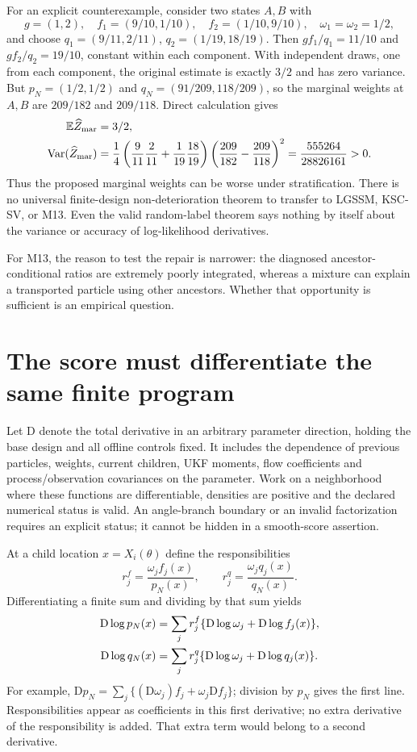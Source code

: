 \documentclass[11pt]{article}
\newcommand{\D}{\mathrm D}
\newcommand{\E}{\mathbb E}
\newcommand{\Var}{\operatorname{Var}}
\begin{document}
For an explicit counterexample, consider two states $A,B$ with
\[
 g=(1,2),\quad f_1=(9/10,1/10),\quad f_2=(1/10,9/10),
 \quad \omega_1=\omega_2=1/2,
\]
and choose $q_1=(9/11,2/11)$, $q_2=(1/19,18/19)$.
Then $g f_1/q_1=11/10$ and $g f_2/q_2=19/10$, constant within
each component. With independent draws, one from each component,
the original estimate is exactly $3/2$ and has zero variance.
But $p_N=(1/2,1/2)$ and $q_N=(91/209,118/209)$, so the marginal
weights at $A,B$ are $209/182$ and $209/118$. Direct calculation gives
\begin{align}
 \E\widehat Z_{\rm mar}&=3/2,\notag\\
 \Var(\widehat Z_{\rm mar})
 &=\frac14\left(\frac9{11}\frac2{11}
                    +\frac1{19}\frac{18}{19}\right)
            \left(\frac{209}{182}-\frac{209}{118}\right)^2
 =\frac{555264}{28826161}>0 .
 \label{eq:counterexample}
\end{align}
Thus the proposed marginal weights can be worse under stratification.
There is no universal finite-design non-deterioration theorem to transfer
to LGSSM, KSC-SV, or M13. Even the valid random-label theorem says nothing
by itself about the variance or accuracy of log-likelihood derivatives.

For M13, the reason to test the repair is narrower: the diagnosed
ancestor-conditional ratios are extremely poorly integrated, whereas
a mixture can explain a transported particle using other ancestors.
Whether that opportunity is sufficient is an empirical question.

\section{The score must differentiate the same finite program}

Let $\D$ denote the total derivative in an arbitrary parameter direction,
holding the base design and all offline controls fixed. It includes the
dependence of previous particles, weights, current children, UKF moments,
flow coefficients and process/observation covariances on the parameter.
Work on a neighborhood where these functions are differentiable, densities
are positive and the declared numerical status is valid. An angle-branch
boundary or an invalid factorization requires an explicit status; it cannot
be hidden in a smooth-score assertion.

At a child location $x=X_i(\theta)$ define the responsibilities
\[
 r_j^f=\frac{\omega_j f_j(x)}{p_N(x)},\qquad
 r_j^q=\frac{\omega_j q_j(x)}{q_N(x)}.
\]
Differentiating a finite sum and dividing by that sum yields
\begin{align}
 \D\log p_N(x)
   &=\sum_j r_j^f\{\D\log\omega_j+\D\log f_j(x)\},\notag\\
 \D\log q_N(x)
   &=\sum_j r_j^q\{\D\log\omega_j+\D\log q_j(x)\}.
 \label{eq:mixture-score}
\end{align}
For example,
$\D p_N=\sum_j\{(\D\omega_j)f_j+\omega_j\D f_j\}$;
division by $p_N$ gives the first line. Responsibilities appear as
coefficients in this first derivative; no extra derivative of the
responsibility is added. That extra term would belong to a second derivative.
\end{document}

